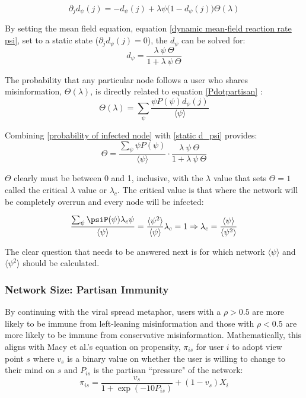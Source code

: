 \documentclass[preprint,review,12pt]{elsarticle}
\begin{document}
\begin{equation}
\label{dynamic mean-field reaction rate psi}
    \partial_jd_{\psi}(j) = - d_{\psi}(j) + \lambda \psi \big(1 - d_{\psi}(j)\big)\Theta(\lambda)
\end{equation}

By setting the mean field equation, equation \ref{dynamic mean-field reaction rate psi}, set to a static state ($\partial_jd_{\psi}(j) = 0$), the $d_{\psi}$ can be solved for:
\begin{equation}
\label{static d_psi}
    d_{\psi} = \frac{\lambda \ \psi \ \Theta}{1 + \lambda \ \psi \ \Theta}
\end{equation}

The probability that any particular node follows a user who shares misinformation, $\Theta(\lambda)$, is directly related to equation \ref{Pdotpartisan} :
\begin{equation}
\label{probability of infected node}
    \Theta(\lambda) = \sum_{\psi} \frac{\psi P(\psi)d_{\psi}(j)}{\langle \psi \rangle}
\end{equation}

Combining \ref{probability of infected node} with \ref{static d_psi} provides:
\begin{equation}
    \Theta =  \frac{\sum_{\psi} \psi P(\psi)}{\langle \psi \rangle}\cdot \frac{\lambda \ \psi \ \Theta}{1 + \lambda \ \psi \ \Theta}
\end{equation}

$\Theta$ clearly must be between 0 and 1, inclusive, with the $\lambda$ value that sets $\Theta = 1$ called the critical $\lambda$ value or $\lambda_c$. The critical value is that where the network will be completely overrun and every node will be infected: 

\begin{equation}
\label{critical value equation}
    \frac{\sum_{\psi} \psiP(\psi)\lambda_c\psi}{\langle \psi \rangle} = \frac{\langle \psi^2 \rangle}{\langle \psi \rangle}\lambda_c = 1 \Rightarrow \lambda_c = \frac{\langle \psi \rangle}{\langle \psi^2 \rangle}
\end{equation}

The clear question that needs to be answered next is for which network $\langle \psi \rangle$ and $\langle \psi^2 \rangle$ should be calculated. 

\subsubsection{Network Size: Partisan Immunity}
By continuing with the viral spread metaphor, users with a $\rho > 0.5$ are more likely to be immune from left-leaning misinformation and those with  $\rho < 0.5$ are more likely to be immune from conservative misinformation. Mathematically, this aligns with Macy et al.'s equation on propensity, $\pi_{is}$ for user $i$ to adopt view point $s$ where $v_s$ is a binary value on whether the user is willing to change to their mind on $s$ and $P_{is}$ is the partisan ``pressure" of the network:
\begin{equation}
\label{propensity}
    \pi_{is}=\frac{v_s}{1+\exp{(-10P_{is})}}+(1-v_{s})X_i
\end{equation}
\end{document}
